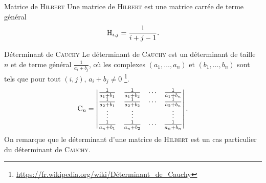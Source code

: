 \begin{box_titre}{Matrice de \textsc{Hilbert}} \label{matrice_hilbert}
    Une matrice de \textsc{Hilbert} est une matrice carrée de terme général
    $$\mathrm{H}_{i,j}={\frac {1}{i+j-1}}.$$
\end{box_titre}

\begin{box_titre}{Déterminant de \textsc{Cauchy}}
    Le déterminant de \textsc{Cauchy} est un déterminant de taille $n$ et de terme général $\frac{1}{a_i+b_j}$, où les complexes $(a_1, \dots, a_n)$ et $(b_1, \dots, b_n)$ sont tels que pour tout $(i, j)$, $a_i+b_j \not= 0$ \footnote{\url{https://fr.wikipedia.org/wiki/Déterminant_de_Cauchy}}.
    $$\mathrm{C}_n = \begin{vmatrix}
        \frac{1}{a_1+b_1} & \frac{1}{a_1+b_2} & \cdots & \frac{1}{a_1+b_n} \\
        \frac{1}{a_2+b_1} & \frac{1}{a_2+b_2} & \cdots & \frac{1}{a_2+b_n} \\
        \vdots & \vdots & & \vdots \\
        \frac{1}{a_n+b_1} & \frac{1}{a_n+b_2} & \cdots & \frac{1}{a_n+b_n}
    \end{vmatrix}.$$
    On remarque que le déterminant d'une matrice de \textsc{Hilbert} est un cas particulier du déterminant de \textsc{Cauchy}.
\end{box_titre}

